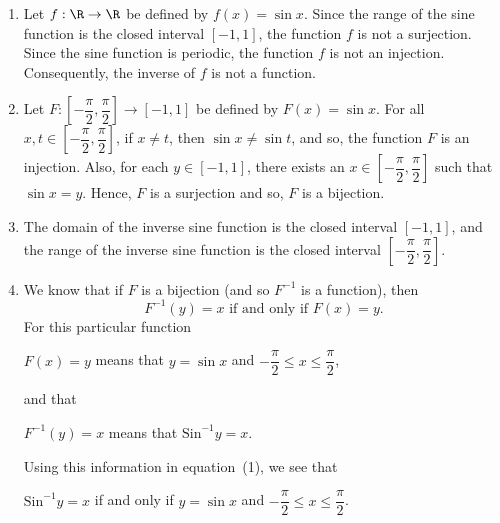\documentclass[11pt]{article}
\begin{document}
\begin{enumerate}
\item Let $f: \R \to \R$ be defined by $f(x) = \sin x$.  Since the range of the sine function is the closed interval $[-1, 1]$, the function $f$ is not a surjection.  Since the sine function is periodic, the function $f$ is not an injection.  Consequently, the inverse of $f$ is not a function.

\item Let $F:\left[ {- \dfrac{{\pi }}{2}, \dfrac{\pi }{2}} \right] \to \left[ { - 1, 1} \right]$
be defined by $F\left( x \right) = \sin x$.  For all 
$x, t \in \left[ {- \dfrac{{\pi }}{2}, \dfrac{\pi }{2}} \right]$, if $x \ne t$, then 
$\sin x \ne \sin t$, and so, the function $F$ is an injection.  Also, for each 
$y \in [-1, 1]$, there exists an $x \in \left[ {- \dfrac{{\pi }}{2}, \dfrac{\pi }{2}} \right]$ such that $\sin x = y$.  Hence, $F$ is a surjection and so, $F$ is a bijection.

\item The domain of the inverse sine function is the closed interval $[-1, 1]$, and the range of the inverse sine function is the closed interval 
$\left[ {- \dfrac{{\pi }}{2}, \dfrac{\pi }{2}} \right]$.

\item We know that if $F$ is a bijection (and so $F^{-1}$ is a function), then
\begin{equation}
F^{-1}(y) = x \text{ if and only if } F(x) = y.
\end{equation}
For this particular function
\begin{center}
$F(x) = y$ means that $y = \sin x$ and $-\dfrac{\pi}{2} \leq x \leq \dfrac{\pi}{2}$,
\end{center}
and that
\begin{center}
$F^{-1}(y) = x$ means that $\text{Sin}^{-1}y = x$.
\end{center}
Using this information in equation~(1), we see that
\begin{center}
$\text{Sin}^{-1}y = x$ if and only if $y = \sin x$ and 
$-\dfrac{\pi}{2} \leq x \leq \dfrac{\pi}{2}$.
\end{center}
\end{enumerate}
\end{document}
